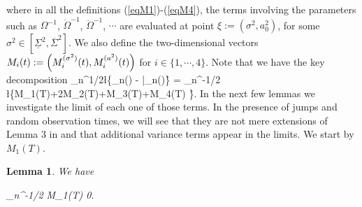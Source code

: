 \documentclass[11pt]{article}
\newtheorem{lemma*}[theorem*]{Lemma}
\numberwithin{equation}{section}
\theoremstyle{plain}
\theoremstyle{remark}
\begin{document}
\label{eqM4}
\eea 
where in all the definitions (\ref{eqM1})-(\ref{eqM4}), the terms involving the parameters such as $\Omega^{-1}$, $\dot{\Omega}^{-1}$, $\ddot{\Omega}^{-1}$, $\cdots$ are evaluated at point $\xi := (\sigma^2,a_0^2)$, for some $\sigma^2 \in [\underline{\Sigma}^2,\overline{\Sigma}^2]$. We also define the two-dimensional vectors $M_i(t) := \left(M_{i}^{(\sigma^2)}(t),M_{i}^{(a^2)}(t)\right)$ for $i \in \{1, \cdots ,4\}$. Note that we have the key decomposition 
\Phi_n^{1/2}\l\{\Psi_n(\xi) - \bar{\Psi}_n(\xi)\r\} = \Phi_n^{-1/2} \l\{M_1(T)+2M_2(T)+M_3(T)+M_4(T) \r\}.
\eeas
In the next few lemmas we investigate the limit of each one of those terms. In the presence of jumps and random observation times, we will see that they are not mere extensions of Lemma 3 in \cite{xiu2010quasi} and that additional variance terms appear in the limits. We start by $M_1(T)$. 

\begin{lemma*} \label{lemmaM1}
We have

\beas  
\Phi_n^{-1/2} M_1(T) \overset{\proba}{\rightarrow} 0.  
\eeas  
\end{lemma*}
\end{document}
